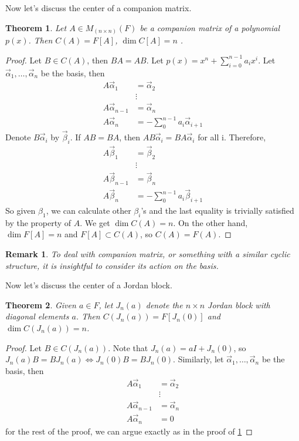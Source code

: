 \documentclass{book}
\newtheorem{theorem}{Theorem}[section]
\newtheorem*{remark}{Remark}
\theoremstyle{definition}
\begin{document}
Now let's discuss the center of a companion matrix.
\begin{theorem}
\label{center of a companion matrix}
Let $A\in M_{(n\times n)}(F)$ be a companion matrix of a polynomial $p(x)$. Then $C(A)=F[A]$, $\dim C[A]=n$ .
\end{theorem}
\begin{proof}
Let $B\in C(A) $, then $BA=AB$. Let $p(x)=x^n+\sum_{i=0}^{n-1}a_ix^i$. Let $\vec{\alpha}_1,\dots,\vec{\alpha}_n$ be the basis, then 
\begin{align*}
    A\vec{\alpha}_1&=\vec{\alpha}_2\\
    &\vdots\\
    A\vec{\alpha}_{n-1}&=\vec{\alpha}_n\\
    A\vec{\alpha}_n&=-\sum_0^{n-1}a_{i}\vec{\alpha}_{i+1}
\end{align*}
Denote $B\vec{\alpha}_i$ by $\vec{\beta}_i$. If $AB=BA$, then $AB\vec{\alpha}_i=BA\vec{\alpha}_i$ for all i. Therefore, 
\begin{align*}
    A\vec{\beta}_1&=\vec{\beta}_2\\
    &\vdots\\
    A\vec{\beta}_{n-1}&=\vec{\beta}_n\\
    A\vec{\beta}_n&=-\sum_0^{n-1}a_{i}\vec{\beta}_{i+1}
\end{align*}
So given $\beta_1$, we can calculate other $\beta_i$'s and the last equality is trivially satisfied by the property of $A$. We get $\dim C(A)=n$. On the other hand, $\dim F[A]=n$ and $F[A]\subset C(A)$, so $C(A)=F(A)$.
\end{proof}
\begin{remark}
To deal with companion matrix, or something with a similar cyclic structure, it is insightful to consider its action on the basis.
\end{remark}

Now let's discuss the center of a Jordan block.
\begin{theorem}
\label{center of a Jordan block}
Given $a\in F$, let $J_n(a)$ denote the $n\times n$ Jordan block with diagonal elements $a$. Then $C(J_n(a))=F[J_n(0)]$ and $\dim C(J_n(a))=n$.
\end{theorem}
\begin{proof}
Let $B\in C(J_n(a))$. Note that $J_n(a)=aI+J_n(0)$, so $J_n(a)B=BJ_n(a)\Longleftrightarrow J_n(0)B=BJ_n(0)$. Similarly, let $\vec{\alpha}_1,\dots,\vec{\alpha}_n$ be the basis, then
\begin{align*}
    A\vec{\alpha}_1&=\vec{\alpha}_2\\
    &\vdots\\
    A\vec{\alpha}_{n-1}&=\vec{\alpha}_n\\
    A\vec{\alpha}_n&=0
\end{align*}
for the rest of the proof, we can argue exactly as in the proof of \ref{center of a companion matrix}
\end{proof}
\end{document}
